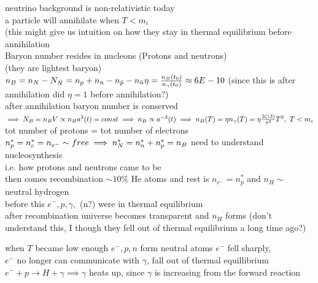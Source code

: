 \documentclass[12pt]{amsart}
\begin{document}
\begin{enumerate}
neutrino background is non-relativistic today\\
a particle will annihilate when $T< m_i$\\
(this might give us intuition on how they stay in thermal equilibrium before annihilation\\
Baryon number resides in nucleons (Protons and neutrons)\\
(they are lightest baryon)\\
$n_B = n_N - N_{\bar{N}}= n_p + n_n - n_{\bar{p}} - n_{\bar{n}}\\\\
\eta= \frac{n_B(t_0)}{n_{\gamma} (t_0)} \approx 6 E -10$ (since this is after annihilation did $\eta=1$ before annihilation?)\\
after annihilation baryon number is conserved\\
$\implies N_B = n_B V \propto n_B a^3(t) = const\\ \implies n_B \propto a^{-3}(t)\\
\implies n_B (T) = \eta n_{\gamma}(T) = \eta \frac{2 \zeta (3)}{\pi^2} T^3,\,\, T< m_e\\$
tot number of protons = tot number of electrons\\
$n_p^* = n_e^* = n_{e^-} \sim free\\
\implies n_N^* = n_n^* + n_p^* = n_B\\$
need to understand nucleosynthesis\\
i.e. how protons and neutrons came to be\\
then comes recombination $\sim 10 \%$ He atoms and rest is $n_{e^-} = n_p^*$ and $n_H \sim$ neutral hydrogen \\
before this $e^-, p , \gamma,$ (n?) were in thermal equilibrium\\
after recombination universe becomes transparent and $n_H$ forms (don't understand this, I though they fell out of thermal equilibrium a long time ago?)


\hdashrule[0.5ex][c]{\linewidth}{0.5pt}{1.5mm}


when $T$ became low enough $e^-, p, n$ form neutral atoms $e^-$ fell sharply,\\
$e^-$ no longer can communicate with $\gamma$, fall out of thermal equillibrium\\
$e^- + p \rightarrow H + \gamma \implies \gamma$ heats up, since $\gamma$ is increasing from the forward reaction\\


\hdashrule[0.5ex][c]{\linewidth}{0.5pt}{1.5mm}



\end{enumerate}
\end{document}
